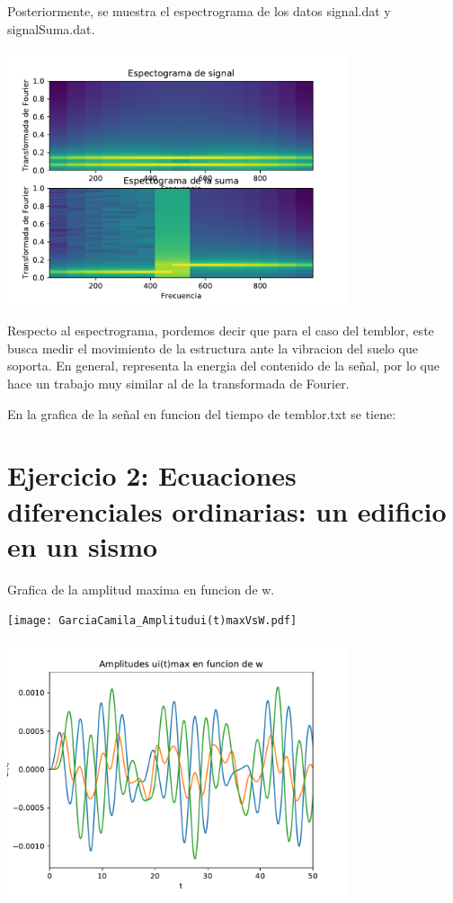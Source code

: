 \documentclass[11pt,letterpaper]{exam}
\begin{document}
Posteriormente, se muestra el espectrograma de los datos signal.dat y signalSuma.dat.

\begin{center}
\includegraphics[width=10cm]{GarciaCamila_Espectrogramas.pdf}
\end{center}

Respecto al espectrograma, pordemos decir que para el caso del temblor, este busca medir el movimiento de la estructura ante la vibracion del suelo que soporta. En general, representa la energia del contenido de la señal, por lo que hace un trabajo muy similar al de la transformada de Fourier. 

En la grafica de la señal en funcion del tiempo de temblor.txt se tiene:

\noindent
\section{Ejercicio 2: Ecuaciones diferenciales ordinarias: un edificio en un sismo}

Grafica de la amplitud maxima en funcion de w. 
\begin{center}
\texttt{[image: GarciaCamila\_Amplitudui(t)maxVsW.pdf]}
\end{center}

\begin{center}
\includegraphics[width=10cm]{PrimeraGraficaUi(t).pdf}
\end{center}
\end{document}
